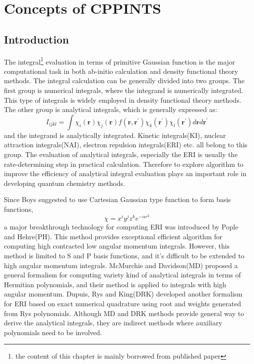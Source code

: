 %
%
%
\chapter{Concepts of CPPINTS}

\section{Introduction}

The integral\footnote{the content of this chapter is mainly borrowed from published paper} 
evaluation in terms of primitive Gaussian 
function is the major computational task in both ab-initio calculation 
and density functional theory methods\cite{gill1994molecular}. The integral 
calculation can be generally divided into two groups. The first group 
is numerical integrals, where the integrand is numerically 
integrated. This type of integrals is widely employed in density 
functional theory methods\cite{Becke,PGPOPLE}. The other group is analytical integrals,
which is generally expressed as:
\begin{equation}\label{int_paper:1}
  I_{ijkl} = \int \chi_{i}(\bm{r})\chi_{j}(\bm{r})f(\bm{r},\bm{r^{'}})
\chi_{k}(\bm{r^{'}})\chi_{l}(\bm{r^{'}}) d\bm{r} d\bm{r^{'}}
\end{equation}
and the integrand is analytically integrated. Kinetic integrals(KI),
nuclear attraction integrals(NAI), electron repulsion integrals(ERI) etc. all 
belong to this group. The evaluation of analytical integrals, especially the ERI is usually the 
rate-determining step in practical calculation. Therefore to explore algorithm 
to improve the efficiency of analytical integral evaluation plays an important role
in developing quantum chemistry methods.

Since Boys\cite{SFBoys1950} suggested to use Cartesian Gaussian type function to form 
basis functions,
\begin{equation}\label{int_paper:2}
 \chi = x^{i}y^{j}z^{k}e^{-\alpha r^{2}}
\end{equation}
a major breakthrough technology for computing ERI was introduced by Pople and Hehre(PH)\cite{PH}. 
This method provides exceptional efficient algorithm for computing high contracted 
low angular momentum integrals. However, this method is limited to S and P basis functions, 
and it's difficult to be extended to high angular momentum integrals. McMurchie and Davidson(MD)\cite{MD}
proposed a general formalism for computing variety kind of analytical integrals in terms of 
Hermitian polynomials, and their method is applied to integrals with high angular momentum. 
Dupuis, Rys and King(DRK)\cite{DRK1976JCOMP,DRK1976JCP,DRK1983JCOMP} developed another formalism 
for ERI based on exact numerical 
quadrature using root and weights generated from Rys polynomials. Although MD and DRK
methods provide general way to derive the analytical integrals, they are indirect methods where
auxiliary polynomials need to be involved. 

